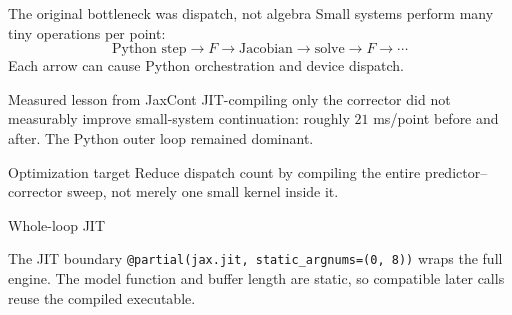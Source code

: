 \documentclass[aspectratio=169,10pt]{beamer}
\begin{document}
\begin{frame}{The original bottleneck was dispatch, not algebra}
Small systems perform many tiny operations per point:
\[
\text{Python step}\to F\to \text{Jacobian}\to\text{solve}\to F\to\cdots
\]
Each arrow can cause Python orchestration and device dispatch.
\begin{alertblock}{Measured lesson from JaxCont}
JIT-compiling only the corrector did not measurably improve small-system continuation: roughly $21$ ms/point before and after. The Python outer loop remained dominant.
\end{alertblock}
\begin{block}{Optimization target}
Reduce dispatch count by compiling the entire predictor--corrector sweep, not merely one small kernel inside it.
\end{block}
\end{frame}

\begin{frame}{Whole-loop JIT}
\centering
{}
\vspace{2mm}
\begin{block}{The JIT boundary}
\small
\texttt{@partial(jax.jit, static\_argnums=(0, 8))} wraps the full engine.
The model function and buffer length are static, so compatible later calls
reuse the compiled executable.
\end{block}
\end{frame}
\end{document}
